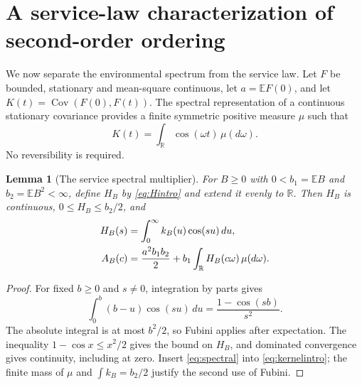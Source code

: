 \documentclass[aap,preprint]{imsart}
\numberwithin{equation}{section}
\theoremstyle{plain}
\newtheorem{lemma}[theorem]{Lemma}
\theoremstyle{definition}
\newcommand{\E}{\mathbb E}
\newcommand{\R}{\mathbb R}
\newcommand{\1}{\mathbf 1}
\DeclareMathOperator{\Cov}{Cov}
\begin{document}
\section{A service-law characterization of second-order ordering}\label{sec:service}
We now separate the environmental spectrum from the service law. Let $F$ be bounded, stationary and mean-square continuous, let $a=\E F(0)$, and let $K(t)=\Cov(F(0),F(t))$. The spectral representation of a continuous stationary covariance \cite{Yaglom87} provides a finite symmetric positive measure $\mu$ such that
\begin{equation}\label{eq:spectral}
 K(t)=\int_{\R}\cos(\omega t)\,\mu(d\omega).
\end{equation}
No reversibility is required.

\begin{lemma}[The service spectral multiplier]\label{lem:servicefilter}
For $B\ge0$ with $0<b_1=\E B$ and $b_2=\E B^2<\infty$, define $H_B$ by \eqref{eq:Hintro} and extend it evenly to $\R$. Then $H_B$ is continuous, $0\le H_B\le b_2/2$, and
\begin{align}\label{eq:servicefilter}
 H_B(s)&=\int_0^\infty k_B(u)\cos(su)\,du,\notag\\
 A_B(c)&=\frac{a^2b_1b_2}{2}
                   +b_1\int_{\R}H_B(c\omega)\,\mu(d\omega).
\end{align}
\end{lemma}
\begin{proof}
For fixed $b\ge0$ and $s\ne0$, integration by parts gives
\[
 \int_0^b(b-u)\cos(su)\,du=\frac{1-\cos(sb)}{s^2}.
\]
The absolute integral is at most $b^2/2$, so Fubini applies after expectation. The inequality $1-\cos x\le x^2/2$ gives the bound on $H_B$, and dominated convergence gives continuity, including at zero. Insert \eqref{eq:spectral} into \eqref{eq:kernelintro}; the finite mass of $\mu$ and $\int k_B=b_2/2$ justify the second use of Fubini.
\end{proof}
\end{document}
